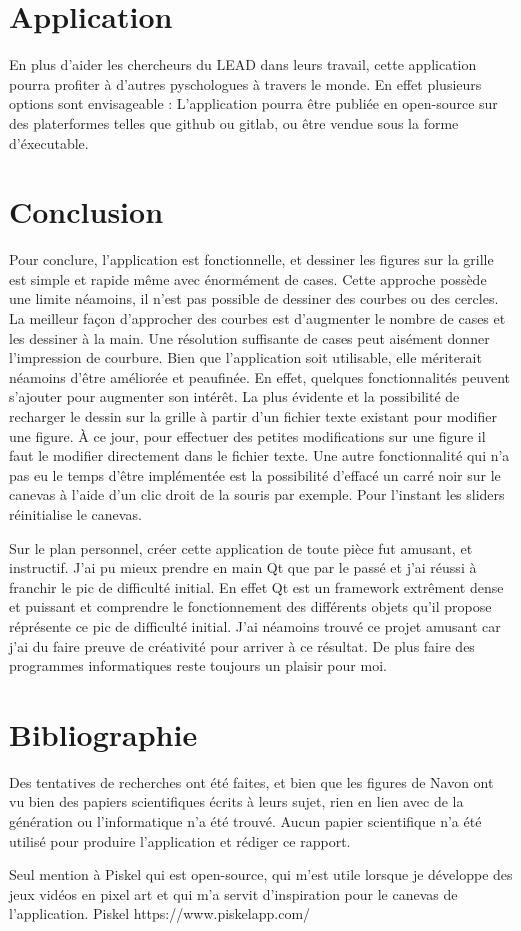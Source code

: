 \documentclass{article}
\begin{document}
	\section{Application}
	En plus d'aider les chercheurs du LEAD dans leurs travail, cette application pourra profiter à d'autres pyschologues à travers le monde. En effet plusieurs options sont envisageable : L'application pourra être publiée en open-source sur des platerformes telles que github ou gitlab, ou être vendue sous la forme d'éxecutable. 

	\section{Conclusion}
	Pour conclure, l'application est fonctionnelle, et dessiner les figures sur la grille est simple et rapide même avec énormément de cases. Cette approche possède une limite néamoins, il n'est pas possible de dessiner des courbes ou des cercles. La meilleur façon d'approcher des courbes est d'augmenter le nombre de cases et les dessiner à la main. Une résolution suffisante de cases peut aisément donner l'impression de courbure. Bien que l'application soit utilisable, elle mériterait néamoins d'être améliorée et peaufinée. En effet, quelques fonctionnalités peuvent s'ajouter pour augmenter son intérêt. La plus évidente et la possibilité de recharger le dessin sur la grille à partir d'un fichier texte existant pour modifier une figure. À ce jour, pour effectuer des petites modifications sur une figure il faut le modifier directement dans le fichier texte. Une autre fonctionnalité qui n'a pas eu le temps d'être implémentée est la possibilité d'effacé un carré noir sur le canevas à l'aide d'un clic droit de la souris par exemple. Pour l'instant les sliders réinitialise le canevas.
	
	Sur le plan personnel, créer cette application de toute pièce fut amusant, et instructif. J'ai pu mieux prendre en main Qt que par le passé et j'ai réussi à franchir le pic de difficulté initial. En effet Qt est un framework extrêment dense et puissant et comprendre le fonctionnement des différents objets qu'il propose réprésente ce pic de difficulté initial. J'ai néamoins trouvé ce projet amusant car j'ai du faire preuve de créativité pour arriver à ce résultat. De plus faire des programmes informatiques reste toujours un plaisir pour moi. 

	\newpage
	\section{Bibliographie}
	Des tentatives de recherches ont été faites, et bien que les figures de Navon ont vu bien des papiers scientifiques écrits à leurs sujet, rien en lien avec de la génération ou l'informatique n'a été trouvé. Aucun papier scientifique n'a été utilisé pour produire l'application et rédiger ce rapport.

	Seul mention à Piskel qui est open-source, qui m'est utile lorsque je développe des jeux vidéos en pixel art et qui m'a servit d'inspiration pour le canevas de l'application.
	Piskel https://www.piskelapp.com/
\end{document}

